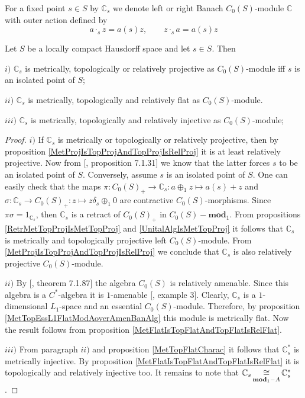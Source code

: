 For a fixed point $s\in S$ by $\mathbb{C}_s$ we denote left or right Banach $C_0(S)$-module $\mathbb{C}$ with outer action defined by
$$
a\cdot_s z=a(s)z,\qquad z\cdot_s a=a(s)z
$$
\begin{proposition}\label{OneDimC0SModMetTopRelProjIngFlat} Let $S$ be a locally compact Hausdorff space and let $s\in S$. Then 

$i)$ $\mathbb{C}_s$ is metrically, topologically or relatively projective as $C_0(S)$-module iff $s$ is an isolated point of $S$;

$ii)$ $\mathbb{C}_s$ is metrically, topologically and relatively flat as $C_0(S)$-module.

$iii)$ $\mathbb{C}_s$ is metrically, topologically and relatively injective as $C_0(S)$-module;

\end{proposition}
\begin{proof} $i)$ If $\mathbb{C}_s$ is metrically or topologically or relatively projective, then by proposition \ref{MetProjIsTopProjAndTopProjIsRelProj} it is at least relatively projective. Now from [\cite{HelBanLocConvAlg}, proposition 7.1.31] we know that the latter forces $s$ to be an isolated point of $S$. Conversely, assume $s$ is an isolated point of $S$. One can easily check that the maps $\pi:C_0(S)_+\to\mathbb{C}_s:a\oplus_1 z\mapsto a(s)+z$ and $\sigma:\mathbb{C}_s\to C_0(S)_+:z\mapsto z\delta_s\oplus_1 0$ are contractive $C_0(S)$-morphisms. Since $\pi\sigma=1_{\mathbb{C}_s}$, then $\mathbb{C}_s$ is a retract of $C_0(S)_+$ in $C_0(S)-\mathbf{mod}_1$. From propositions \ref{RetrMetTopProjIsMetTopProj} and \ref{UnitalAlgIsMetTopProj} it follows that $\mathbb{C}_s$ is metrically and topologically projective left $C_0(S)$-module. From \ref{MetProjIsTopProjAndTopProjIsRelProj} we conclude that $\mathbb{C}_s$ is also relatively projective $C_0(S)$-module.

$ii)$ By [\cite{HelBanLocConvAlg}, theorem 7.1.87] the algebra $C_0(S)$ is relatively amenable. Since this algebra is a $C^*$-algebra it is $1$-amenable [\cite{RundeAmenConstFour}, example 3]. Clearly, $\mathbb{C}_s$ is a $1$-dimensional $L_1$-space and an essential $C_0(S)$-module. Therefore, by proposition \ref{MetTopEssL1FlatModAoverAmenBanAlg} this module is metrically flat. Now the result follows from proposition \ref{MetFlatIsTopFlatAndTopFlatIsRelFlat}.

$iii)$ From paragraph $ii)$ and proposition \ref{MetTopFlatCharac} it follows that $\mathbb{C}_s^*$ is metrically injective. By proposition \ref{MetFlatIsTopFlatAndTopFlatIsRelFlat} it is topologically and relatively injective too. It remains to note that $\mathbb{C}_s\mathop{\mathbin{\cong}}\limits_{\mathbf{mod}_1-A}\mathbb{C}_s^*$. 
\end{proof}

